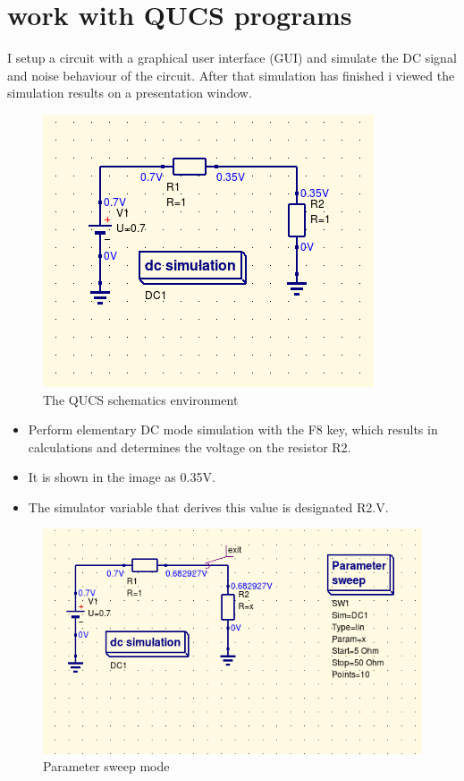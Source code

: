 \documentclass{report}
\begin{document}
\section{work with QUCS programs}
I setup a circuit with a graphical user interface (GUI) and simulate the DC signal and noise behaviour of the circuit. After that simulation has finished i viewed the simulation results on a presentation window.\hfill \break
\begin{figure}[h]
\includegraphics[]{02sch.png}
\newline
\centering
\caption{The QUCS schematics environment}
\end{figure}
\begin{itemize}
\item Perform elementary DC mode simulation with the F8 key, which results in calculations
and determines the voltage on the resistor R2.\newline
\hfill \break
\item It is shown in the image as 0.35V.\newline
\hfill \break
\item The simulator variable that derives this
value is designated R2.V.
\end{itemize}
\clearpage
\begin{figure}[h]
\centering
\includegraphics[]{03sch.png}
\caption{Parameter sweep mode}
\end{figure}
\end{document}
